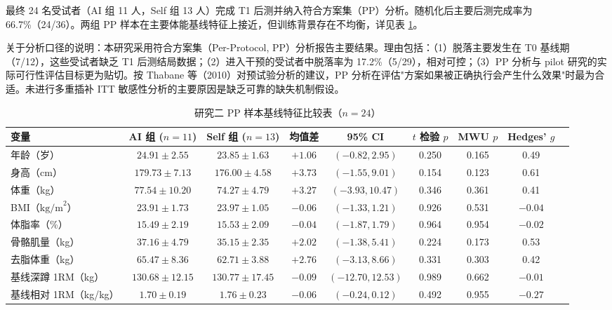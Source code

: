 \documentclass[UTF8,zihao=-4,twoside,openany]{ctexbook}
\begin{document}
最终 24 名受试者（AI 组 11 人，Self 组 13 人）完成 T1 后测并纳入符合方案集（PP）分析。随机化后主要后测完成率为 66.7\%（24/36）。两组 PP 样本在主要体能基线特征上接近，但训练背景存在不均衡，详见表 \ref{tab:ch4-baseline}。

关于分析口径的说明：本研究采用符合方案集（Per-Protocol, PP）分析报告主要结果。理由包括：（1）脱落主要发生在 T0 基线期（7/12），这些受试者缺乏 T1 后测结局数据；（2）进入干预的受试者中脱落率为 17.2\%（5/29），相对可控；（3）PP 分析与 pilot 研究的实际可行性评估目标更为贴切。按 Thabane 等（2010）对预试验分析的建议，PP 分析在评估"方案如果被正确执行会产生什么效果"时最为合适。未进行多重插补 ITT 敏感性分析的主要原因是缺乏可靠的缺失机制假设。

\begin{table}[htbp]
  \centering
  \caption{研究二 PP 样本基线特征比较表（$n=24$）}
  \label{tab:ch4-baseline}
  \vspace{6pt}
  \fontsize{8.5pt}{11pt}\selectfont
  \setlength{\tabcolsep}{3.5pt}
  \begin{tabularx}{\textwidth}{lcccccccc}
    \toprule
    \textbf{变量} & \textbf{AI 组 ($n=11$)} & \textbf{Self 组 ($n=13$)} & \textbf{均值差} & \textbf{95\% CI} & \textbf{$t$ 检验 $p$} & \textbf{MWU $p$} & \textbf{Hedges' $g$} \\
    \midrule
    年龄（岁） & $24.91 \pm 2.55$ & $23.85 \pm 1.63$ & $+1.06$ & $(-0.82, 2.95)$ & 0.250 & 0.165 & 0.49 \\
    身高（cm） & $179.73 \pm 7.13$ & $176.00 \pm 4.58$ & $+3.73$ & $(-1.55, 9.01)$ & 0.154 & 0.123 & 0.61 \\
    体重（kg） & $77.54 \pm 10.20$ & $74.27 \pm 4.79$ & $+3.27$ & $(-3.93, 10.47)$ & 0.346 & 0.361 & 0.41 \\
    BMI（$\text{kg/m}^2$） & $23.91 \pm 1.73$ & $23.97 \pm 1.05$ & $-0.06$ & $(-1.33, 1.21)$ & 0.926 & 0.531 & $-0.04$ \\
    体脂率（\%） & $15.49 \pm 2.19$ & $15.53 \pm 2.09$ & $-0.04$ & $(-1.87, 1.79)$ & 0.964 & 0.954 & $-0.02$ \\
    骨骼肌量（kg） & $37.16 \pm 4.79$ & $35.15 \pm 2.35$ & $+2.02$ & $(-1.38, 5.41)$ & 0.224 & 0.173 & 0.53 \\
    去脂体重（kg） & $65.47 \pm 8.36$ & $62.71 \pm 3.88$ & $+2.76$ & $(-3.13, 8.66)$ & 0.331 & 0.303 & 0.42 \\
    基线深蹲 1RM（kg） & $130.68 \pm 12.15$ & $130.77 \pm 17.45$ & $-0.09$ & $(-12.70, 12.53)$ & 0.989 & 0.662 & $-0.01$ \\
    基线相对 1RM（kg/kg） & $1.70 \pm 0.19$ & $1.76 \pm 0.23$ & $-0.06$ & $(-0.24, 0.12)$ & 0.492 & 0.955 & $-0.27$ \\

\end{tabularx}
\end{table}
\end{document}
